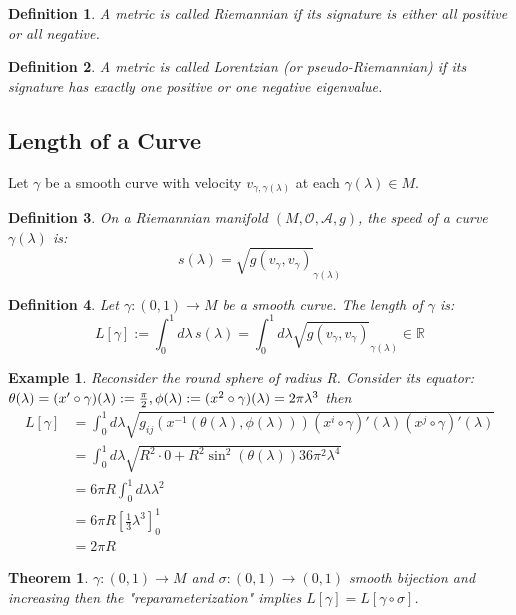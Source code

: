 \documentclass[10pt, oneside]{article}
\newcommand{\R}{\mathbb{R}}
\newtheorem{thm}{Theorem}
\newtheorem{defn}{Definition}
\newtheorem{example}{Example}
\begin{document}
\begin{defn}
A metric is called \emph{Riemannian} if its signature is either all positive or all negative.
\end{defn}


\begin{defn}
A metric is called \emph{Lorentzian} (or pseudo-Riemannian) if its signature has exactly one positive or one negative eigenvalue.
\end{defn}


\subsection{Length of a Curve}
Let $\gamma$ be a smooth curve with velocity $v_{\gamma, \gamma(\lambda)}$ at each $\gamma(\lambda) \in M$.


\begin{defn}
On a Riemannian manifold $(M, \mathcal{O},\mathcal{A},g)$, the speed of a curve $\gamma(\lambda)$ is:
\[ s(\lambda) = \sqrt{g(v_{\gamma},v_{\gamma})}_{\gamma (\lambda)}
\]
\end{defn}


\begin{defn}
Let $\gamma\colon (0,1) \to M$ be a smooth curve. The length of $\gamma$ is:
\[ L[\gamma] := \int_{0}^{1} d\lambda\, s(\lambda) = \int_{0}^{1} d\lambda \sqrt{g(v_{\gamma},v_{\gamma})}_{\gamma (\lambda)} \in \R
\]
\end{defn}
\begin{example}
Reconsider the round sphere of radius R. Consider its equator: $\theta(\lambda) = (x' \circ \gamma)(\lambda) := \frac{\pi}{2}, \phi (\lambda) := (x^2 \circ \gamma)(\lambda) = 2 \pi \lambda^3 \\$
then
\begin{align*}
L[\gamma] &= \int_{0}^{1}d \lambda \sqrt{g_{ij} (x^{-1}(\theta(\lambda),\phi(\lambda)))(x^i \circ \gamma)' (\lambda)(x^j \circ \gamma)'(\lambda)} \\
&= \int_{0}^{1} d \lambda \sqrt{R^2 \cdot 0 + R^2 \sin^2(\theta(\lambda)) 36 \pi^2 \lambda^4}\\
&= 6 \pi R \int_{0}^{1}d \lambda \lambda^2 \\
&= 6 \pi R[\frac{1}{3} \lambda^3]^{1}_{0} \\
&= 2 \pi R
\end{align*}
\end{example}
\begin{thm}
$\gamma: (0,1) \to M$ and $\sigma: (0,1) \to (0,1)$ smooth bijection and increasing then the "reparameterization" implies $L[\gamma] = L[\gamma \circ \sigma]$.
\end{thm}
\end{document}
